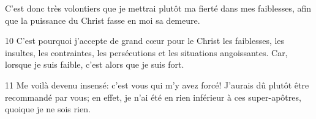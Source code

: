 C’est donc très volontiers que je mettrai plutôt ma fierté dans mes faiblesses, afin que la puissance du Christ fasse en moi sa demeure.

10 C’est pourquoi j’accepte de grand cœur pour le Christ les faiblesses, les insultes, les contraintes, les persécutions et les situations angoissantes. Car, lorsque je suis faible, c’est alors que je suis fort.

11 Me voilà devenu insensé: c’est vous qui m’y avez forcé! J’aurais dû plutôt être recommandé par vous; en effet, je n’ai été en rien inférieur à ces super-apôtres, quoique je ne sois rien.